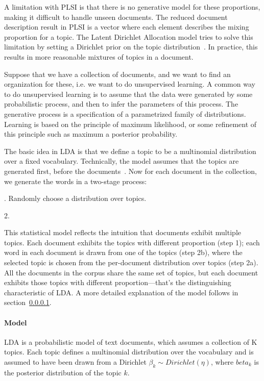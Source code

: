 \documentclass[12pt]{report}
\begin{document}
A limitation with PLSI is that there is no generative model for these
proportions, making it difficult to handle unseen documents. The reduced
document description result in PLSI is a vector where each element describes the
mixing proportion for a topic. The Latent Dirichlet Allocation model tries to
solve this limitation by setting a Dirichlet prior on the topic
distribution~\cite{blei2003latent}. In practice, this results in more reasonable
mixtures of topics in a document.
 
Suppose that we have a collection of documents, and we want to find an
organization for these, i.e. we want to do unsupervised learning. A common way
to do unsupervised learning is to assume that the data were generated by some
probabilistic process, and then to infer the parameters of this process. The
generative process is a specification of a parametrized family of
distributions. Learning is based on the principle of maximum likelihood, or
some refinement of this principle such as maximum a posterior probability.
 
The basic idea in LDA is that we define a topic to be a multinomial
distribution over a fixed vocabulary. Technically, the model assumes 
that the topics are generated first, before the
documents~\cite{Blei11introductionto}. Now for each document in the
collection, we generate the words in a two-stage process:

\begin{algorithm}[H]
. Randomly choose a distribution over topics.

2. 
\end{algorithm}

This statistical model reflects the intuition that documents exhibit
multiple topics. Each document exhibits the topics with different
proportion (step 1); each word in each document is drawn from one of
the topics (step 2b), where the selected topic is chosen from the
per-document distribution over topics (step 2a). All the documents in
the corpus share the same set of topics, but each document exhibits
those topics with different proportion---that's the distinguishing
characteristic of LDA. A more detailed explanation of the model
follows in section~\ref{LDAmodel}.

\paragraph{Model}
\label{LDAmodel}
LDA is a probabilistic model of text documents, which assumes a
collection of K topics. Each topic defines a multinomial distribution
over the vocabulary and is assumed to have been drawn from a Dirichlet
$\beta_k \sim Dirichlet(\eta)$, where $beta_k$ is the posterior 
distribution of the topic $k$.
\end{document}
